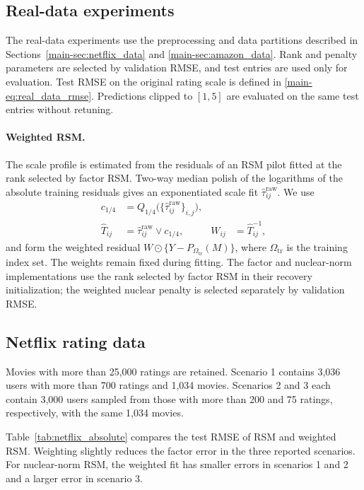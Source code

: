 \documentclass[numsec,webpdf,modern,large,namedate]{oup-authoring-template}
\theoremstyle{plain}
\theoremstyle{remark}
\newif\ifmarkchanges
\newenvironment{revision}{\begingroup\ifmarkchanges\color{red}\fi}{\endgroup}
\begin{document}
\begin{revision}
\subsection{Real-data experiments}
\label{sec:real_data_implementation}
The real-data experiments use the preprocessing and data partitions described in Sections~\ref{main-sec:netflix_data} and \ref{main-sec:amazon_data}. Rank and penalty parameters are selected by validation RMSE, and test entries are used only for evaluation. Test RMSE on the original rating scale is defined in \eqref{main-eq:real_data_rmse}. Predictions clipped to $[1,5]$ are evaluated on the same test entries without retuning.

\paragraph{Weighted RSM.}
The scale profile is estimated from the residuals of an RSM pilot fitted at the rank selected by factor RSM. Two-way median polish of the logarithms of the absolute training residuals gives an exponentiated scale fit $\widehat\tau_{ij}^{\mathrm{raw}}$. We use
\begin{align}
 c_{1/4}&=Q_{1/4}\bigl(\{\widehat\tau_{ij}^{\mathrm{raw}}\}_{i,j}\bigr),\nonumber\\
 \widehat T_{ij}&=\widehat\tau_{ij}^{\mathrm{raw}}\vee c_{1/4},
 &W_{ij}&=\widehat T_{ij}^{-1},
 \label{eq:real_data_inverse_scale_weights}
\end{align}
and form the weighted residual $W\odot\{Y-P_{\Omega_{\mathrm{tr}}}(M)\}$, where $\Omega_{\mathrm{tr}}$ is the training index set. The weights remain fixed during fitting. The factor and nuclear-norm implementations use the rank selected by factor RSM in their recovery initialization; the weighted nuclear penalty is selected separately by validation RMSE.

\end{revision}

\begin{revision}
\subsection{Netflix rating data}
Movies with more than 25,000 ratings are retained. Scenario 1 contains 3,036 users with more than 700 ratings and 1,034 movies. Scenarios 2 and 3 each contain 3,000 users sampled from those with more than 200 and 75 ratings, respectively, with the same 1,034 movies.

Table~\ref{tab:netflix_absolute} compares the test RMSE of RSM and weighted RSM. Weighting slightly reduces the factor error in the three reported scenarios. For nuclear-norm RSM, the weighted fit has smaller errors in scenarios 1 and 2 and a larger error in scenario 3.

\end{revision}
\end{document}
